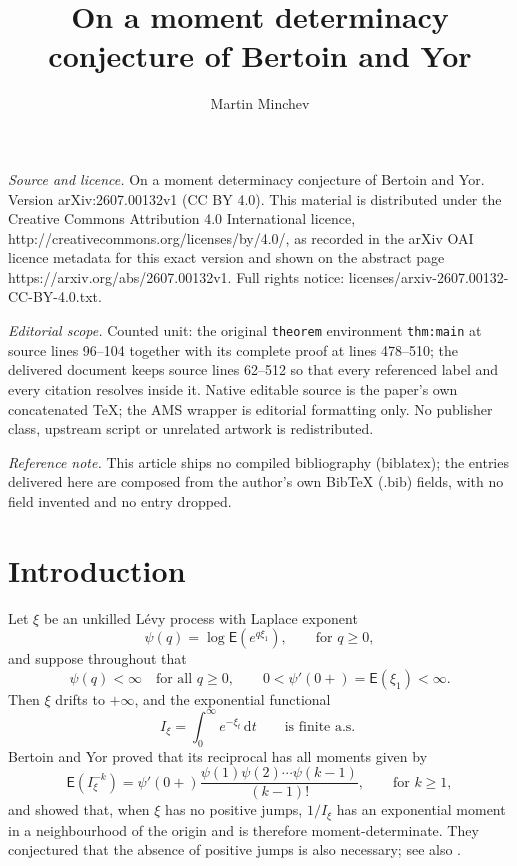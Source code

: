 \documentclass[10pt,a4paper]{amsart}
\newcommand{\E}{\mathsf E}
\newcommand{\1}{\mathbf 1}
\newcommand{\dd}{\mathrm d}
\begin{document}
\title[On a moment determinacy conjecture of Bertoin and Yor]{On a moment determinacy conjecture of Bertoin and Yor}
\author{Martin Minchev}
\date{}
\maketitle
\noindent\emph{Source and licence.} On a moment determinacy conjecture of Bertoin and Yor. Version arXiv:2607.00132v1 (CC BY 4.0). This material is distributed under the Creative Commons Attribution 4.0 International licence, http://creativecommons.org/licenses/by/4.0/, as recorded in the arXiv OAI licence metadata for this exact version and shown on the abstract page https://arxiv.org/abs/2607.00132v1. Full rights notice: licenses/arxiv-2607.00132-CC-BY-4.0.txt.\par\smallskip
\noindent\textit{Editorial scope.} Counted unit: the original \texttt{theorem} environment \texttt{thm:main} at source lines 96--104 together with its complete proof at lines 478--510; the delivered document keeps source lines 62--512 so that every referenced label and every citation resolves inside it. Native editable source is the paper's own concatenated TeX; the AMS wrapper is editorial formatting only. No publisher class, upstream script or unrelated artwork is redistributed.\par\smallskip\noindent\textit{Reference note.} This article ships no compiled bibliography (biblatex); the entries delivered here are composed from the author's own BibTeX (.bib) fields, with no field invented and no entry dropped.
\section{Introduction}

Let $\xi$ be an unkilled L\'evy process with Laplace exponent
\[
 \psi(q)=\log \E(e^{q\xi_1}),
 \qquad
 \text{for }q\geq0,
\]
and suppose throughout that
\begin{equation}\label{eq:standing}
 \psi(q)<\infty\quad\text{for all }q\geq0,
 \qquad
 0<\psi'(0+)=\E(\xi_1)<\infty.
\end{equation}
Then $\xi$ drifts to $+\infty$, and the exponential functional
\[
 I_\xi=\int_0^\infty e^{-\xi_t}\,\dd t\qquad
 \text{is finite a.s. }
\]
Bertoin and Yor \cite{Bertoin-Yor-2002} proved that its reciprocal has all moments given by
\begin{equation}\label{eq:BY}
 \E(I_\xi^{-k})=
 \psi'(0+)\frac{\psi(1)\psi(2)\cdots\psi(k-1)}{(k-1)!},
 \qquad
 \text{for }k\geq1,
\end{equation}
and showed that, when $\xi$ has no positive jumps, $1/I_\xi$ has an exponential moment in a neighbourhood of the origin and is therefore moment-determinate. They conjectured that the absence of positive jumps is also necessary; see also \cite{Bertoin-Yor-2005,Minchev-Savov-2026}.
\end{document}
